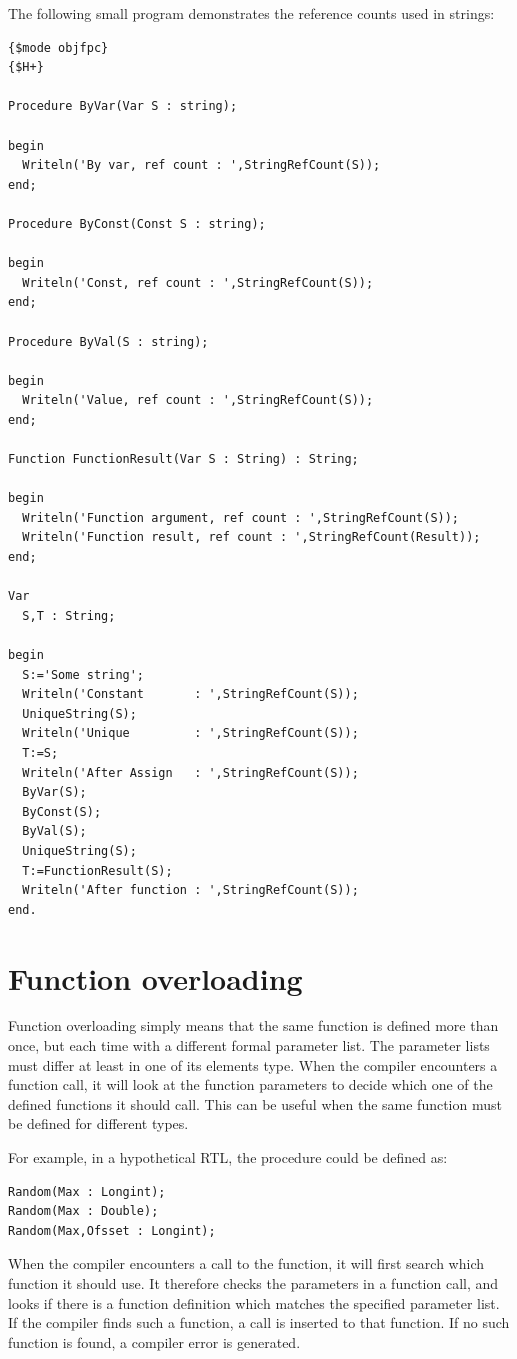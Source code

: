 The following small program demonstrates the reference counts used in strings:
\begin{verbatim}
{$mode objfpc}
{$H+}

Procedure ByVar(Var S : string);

begin
  Writeln('By var, ref count : ',StringRefCount(S));
end;

Procedure ByConst(Const S : string);

begin
  Writeln('Const, ref count : ',StringRefCount(S));
end;

Procedure ByVal(S : string);

begin
  Writeln('Value, ref count : ',StringRefCount(S));
end;

Function FunctionResult(Var S : String) : String;

begin
  Writeln('Function argument, ref count : ',StringRefCount(S));
  Writeln('Function result, ref count : ',StringRefCount(Result));
end;

Var
  S,T : String;

begin
  S:='Some string';
  Writeln('Constant       : ',StringRefCount(S));
  UniqueString(S);
  Writeln('Unique         : ',StringRefCount(S));
  T:=S;
  Writeln('After Assign   : ',StringRefCount(S));
  ByVar(S);
  ByConst(S);
  ByVal(S);
  UniqueString(S);
  T:=FunctionResult(S);
  Writeln('After function : ',StringRefCount(S));
end.
\end{verbatim}


\section{Function overloading}
Function overloading simply means that the same function is defined more
than once, but each time with a different formal parameter list.
The parameter lists must differ at least in one of its elements type.
When the compiler encounters a function call, it will look at the function
parameters to decide which one of the defined functions it should call.
This can be useful when the same function must be defined for different
types.

For example, in a hypothetical RTL, the   procedure could be defined as:
\begin{verbatim}
Random(Max : Longint);
Random(Max : Double);
Random(Max,Ofsset : Longint);
\end{verbatim}
When the compiler encounters a call to the  function, it will first search
which function it should use. It therefore checks the parameters in a
function call, and looks if there is a function definition which matches the
specified parameter list. If the compiler finds such a function, a call is
inserted to that function. If no such function is found, a compiler error is
generated.

